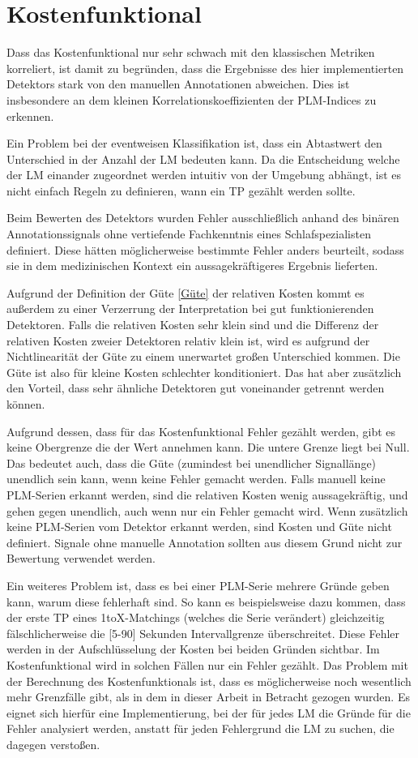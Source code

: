 \section{Kostenfunktional}

Dass das Kostenfunktional nur sehr schwach mit den klassischen Metriken korreliert, ist damit zu begründen, dass die Ergebnisse des hier implementierten Detektors stark von den manuellen Annotationen abweichen. Dies ist insbesondere an dem kleinen Korrelationskoeffizienten der PLM-Indices zu erkennen.

Ein Problem bei der eventweisen Klassifikation ist, dass ein Abtastwert den Unterschied in der Anzahl der LM bedeuten kann. Da die Entscheidung welche der LM einander zugeordnet werden intuitiv von der Umgebung abhängt, ist es nicht einfach Regeln zu definieren, wann ein TP gezählt werden sollte.

Beim Bewerten des Detektors wurden Fehler ausschließlich anhand des binären Annotationssignals ohne vertiefende Fachkenntnis eines Schlafspezialisten definiert. Diese hätten möglicherweise bestimmte Fehler anders beurteilt, sodass sie in dem medizinischen Kontext ein aussagekräftigeres Ergebnis lieferten. 

Aufgrund der Definition der Güte \ref{Güte} der relativen Kosten kommt es außerdem zu einer Verzerrung der Interpretation bei gut funktionierenden Detektoren. Falls die relativen Kosten sehr klein sind und die Differenz der relativen Kosten zweier Detektoren relativ klein ist, wird es aufgrund der Nichtlinearität der Güte zu einem unerwartet großen Unterschied kommen. Die Güte ist also für kleine Kosten schlechter konditioniert. Das hat aber zusätzlich den Vorteil, dass sehr ähnliche Detektoren gut voneinander getrennt werden können.

Aufgrund dessen, dass für das Kostenfunktional Fehler gezählt werden, gibt es keine Obergrenze die der Wert annehmen kann. Die untere Grenze liegt bei Null. Das bedeutet auch, dass die Güte (zumindest bei unendlicher Signallänge) unendlich sein kann, wenn keine Fehler gemacht werden. 
Falls manuell keine PLM-Serien erkannt werden, sind die relativen Kosten wenig aussagekräftig, und gehen gegen unendlich, auch wenn nur ein Fehler gemacht wird. Wenn zusätzlich keine PLM-Serien vom Detektor erkannt werden, sind Kosten und Güte nicht definiert. Signale ohne manuelle Annotation sollten aus diesem Grund nicht zur Bewertung verwendet werden. 

Ein weiteres Problem ist, dass es bei einer PLM-Serie mehrere Gründe geben kann, warum diese fehlerhaft sind. So kann es beispielsweise dazu kommen, dass der erste TP eines 1toX-Matchings (welches die Serie verändert) gleichzeitig fälschlicherweise die [5-90] Sekunden Intervallgrenze überschreitet. 
Diese Fehler werden in der Aufschlüsselung der Kosten bei beiden Gründen sichtbar. Im Kostenfunktional wird in solchen Fällen nur ein Fehler gezählt.
Das Problem mit der Berechnung des Kostenfunktionals ist, dass es möglicherweise noch wesentlich mehr Grenzfälle gibt, als in dem in dieser Arbeit in Betracht gezogen wurden. Es eignet sich hierfür eine Implementierung, bei der für jedes LM die Gründe für die Fehler analysiert werden, anstatt für jeden Fehlergrund die LM zu suchen, die dagegen verstoßen.


